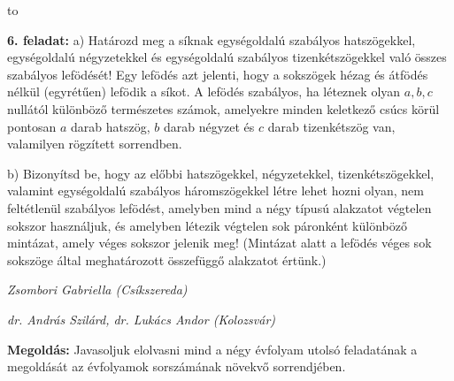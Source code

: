 \documentclass[a4paper,10pt]{article}
\newcommand{\ki}[2]{\hfill {\it #1 (#2)}\medskip}
\newcommand{\vonal}{\hbox to \hsize{\hskip2truecm\hrulefill\hskip2truecm}}
\begin{document}
\medskip
\vonal

{\bf 6. feladat: } a) Határozd meg a síknak egységoldalú szabályos
hatszögekkel, egy\-ség\-oldalú négyzetekkel és
egységoldalú szabályos tizenkétszögekkel való összes
szabályos lefödését! Egy lefödés azt jelenti, hogy a
sokszögek hézag és átfödés nélkül (egyrétűen)
lefödik a síkot. A lefödés szabályos, ha léteznek olyan
$a,b,c$ nullától különböző természetes számok,
amelyekre minden keletkező csúcs körül pontosan $a$ darab
hatszög, $b$ darab négyzet és $c$ darab tizenkétszög van,
valamilyen rögzített sorrendben.

b) Bizonyítsd be, hogy az előbbi hatszögekkel,
négyzetekkel, tizenkétszögekkel, valamint egységoldalú
szabályos háromszögek\-kel létre lehet hozni olyan, nem
feltétlenül sza\-bá\-lyos lefödést, amelyben mind a négy
típusú alakzatot végtelen sokszor hasz\-náljuk, és
amelyben létezik végtelen sok páronként különböző
mintázat, amely véges sokszor jelenik meg! (Mintázat alatt a
lefödés véges sok sokszöge által meghatározott
összefüggő alakzatot értünk.)

\ki{Zsombori Gabriella}{Csíkszereda}

\ki{dr. András Szilárd, dr. Lukács Andor}{Kolozsvár}\medskip

{\bf Megoldás: } Javasoljuk elolvasni mind a négy évfolyam utolsó feladatának
a megoldását az évfolyamok sorszámának nö\-vek\-vő
sorrendjében.
\end{document}
